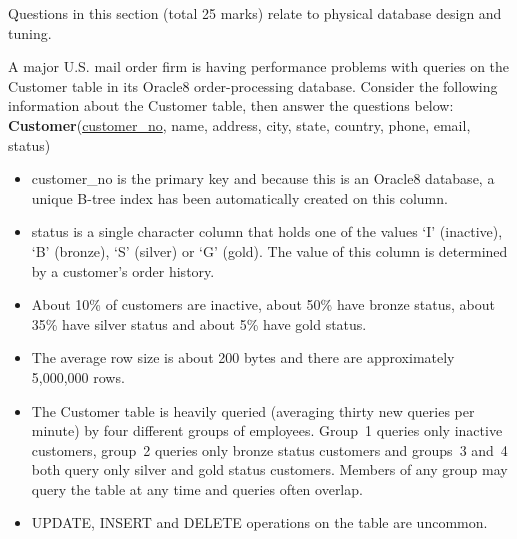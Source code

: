 \begin{examsection}{25}{}{Questions in this section (total 25 marks) relate to
physical database design and tuning.}


\begin{question}{10}

	A major U.S. mail order firm is having performance problems with queries on
	the \textsf{Customer} table in its Oracle8 order-processing database.
	Consider the following information about the \textsf{Customer} table, then
	answer the questions below:	\\

	\textsf{\textbf{Customer}(\underline{customer\_no}, name, address, city,
	state, country, phone, email, status)}

	\begin{itemize}

		\item \textsf{customer\_no} is the primary key and because this is an
		Oracle8 database, a unique B-tree index has been automatically created
		on this column.

		\item \textsf{status} is a single character column that holds one of
		the values `I' (inactive), `B' (bronze), `S' (silver) or `G' (gold).
		The value of this column is determined by a customer's order history.

		\item About 10\% of customers are inactive, about 50\% have bronze
		status, about 35\% have silver status and about 5\% have gold status.

		\item The average row size is about 200 bytes and there are
		approximately 5,000,000 rows.

		\item The \textsf{Customer} table is heavily queried (averaging thirty
		new queries per minute) by four different groups of employees. Group~1
		queries only inactive customers, group~2 queries only bronze status
		customers and groups~3 and~4 both query only silver and gold status
		customers. Members of any group may query the table at any time and
		queries often overlap.

		\item UPDATE, INSERT and DELETE operations on the table are uncommon.


\end{itemize}
\end{question}
\end{examsection}
